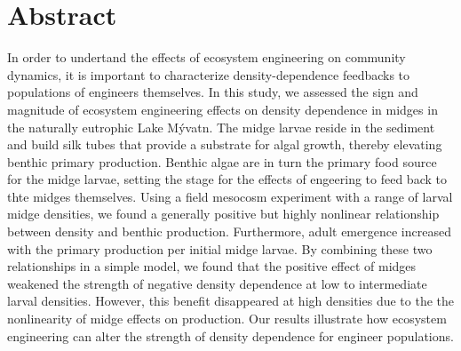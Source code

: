 
\section*{Abstract}

In order to undertand the effects of ecosystem engineering on community dynamics,
it is important to characterize density-dependence feedbacks 
to populations of engineers themselves.
In this study, we assessed the sign and magnitude of ecosystem engineering effects 
on density dependence in 
midges in the naturally eutrophic Lake M\'{y}vatn. 
The midge larvae reside in the sediment and build silk tubes that provide 
a substrate for algal growth, thereby elevating benthic primary production.
Benthic algae are in turn the primary food source for the midge larvae,
setting the stage for the effects of engeering to feed back to thte midges themselves.
Using a field mesocosm experiment with a range of larval midge densities,
we found a generally positive but highly nonlinear relationship between
density and benthic production.
Furthermore, 
adult emergence increased with the primary production per initial midge larvae.
By combining these two relationships in a simple model,
we found that the positive effect of midges weakened the strength of negative density
dependence at low to intermediate larval densities.
However, this benefit disappeared at high densities due to the the nonlinearity of 
midge effects on production.
Our results illustrate how ecosystem engineering can alter the strength 
of density dependence for engineer populations.


